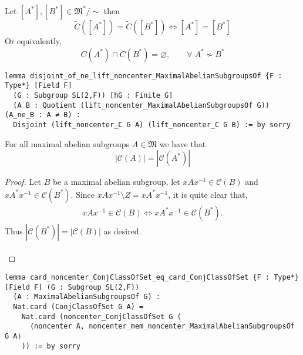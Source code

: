 \begin{theorem}
  \label{disjoint_of_ne_lift_noncenter_MaximalAbelianSubgroupsOf}
  \leanok
  Let $[A^*], [B^*] \in \mathfrak{M}^* / \sim$ then
  \[
  \tilde{C}([A^*]) = \tilde{C}([B^*]) \iff [A^*] = [B^*]
  \]
  Or equivalently,
  \[ 
  C(A^*) \cap C(B^*) = \varnothing, \qquad \forall \;  A^* \not\sim B^* 
  \]
\end{theorem}
\begin{footnotesize}
\begin{verbatim}
lemma disjoint_of_ne_lift_noncenter_MaximalAbelianSubgroupsOf {F : Type*} [Field F]
  (G : Subgroup SL(2,F)) [hG : Finite G]
  (A B : Quotient (lift_noncenter_MaximalAbelianSubgroupsOf G)) (A_ne_B : A ≠ B) :
  Disjoint (lift_noncenter_C G A) (lift_noncenter_C G B) := by sorry
\end{verbatim}
\end{footnotesize}


\begin{theorem}
  \label{card_noncenter_ConjClassOfSet_eq_card_ConjClassOfSet}
  For all maximal abelian subgroups $A \in \mathfrak{M}$ we have that 
  \[
  |\mathcal{C}(A)| = |\mathcal{C}(A^*)|
  \]
\end{theorem}
\begin{proof}
  Let $B$ be a maximal abelian subgroup, let $x A x^{-1} \in \mathcal{C}(B)$ and $x A^* x^{-1} \in \mathcal{C}(B^*)$. Since $x A x^{-1} \! \setminus \! Z = x A^* x^{-1}$, it is quite clear that,
  \begin{align*} x A x^{-1} \in \mathcal{C}(B) \iff x A^* x^{-1} \in \mathcal{C}(B^*).
  \end{align*}
  Thus $|\mathcal{C}(B^*)| = |\mathcal{C}(B)|$ as desired. \\
  \\
\end{proof}
\begin{footnotesize}
\begin{verbatim}
lemma card_noncenter_ConjClassOfSet_eq_card_ConjClassOfSet {F : Type*} [Field F] (G : Subgroup SL(2,F))
  (A : MaximalAbelianSubgroupsOf G) :
  Nat.card (ConjClassOfSet G A) =
    Nat.card (noncenter_ConjClassOfSet G (
      ⟨noncenter A, noncenter_mem_noncenter_MaximalAbelianSubgroupsOf G A⟩
    )) := by sorry
\end{verbatim}
\end{footnotesize}

